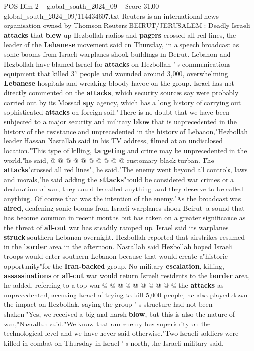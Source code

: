 \begin{textsample}{POS Dim 2 – global\_south\_2024\_09 – Score 31.00 – global\_south\_2024\_09/114434607.txt}  \label{ex:f2_pos_039}
Reuters is an international news organisation owned by Thomson Reuters BEIRUT/JERUSALEM : Deadly Israeli \textbf{attacks} that \textbf{blew} up Hezbollah radios and \textbf{pagers} crossed all red lines, the leader of the \textbf{Lebanese} movement said on Thursday, in a speech broadcast as sonic booms from Israeli warplanes shook buildings in Beirut.
Lebanon and Hezbollah have blamed Israel for \textbf{attacks} on Hezbollah ' s communications equipment that killed 37 people and wounded around 3,000, overwhelming \textbf{Lebanese} hospitals and wreaking bloody havoc on the group.
Israel has not directly commented on the \textbf{attacks}, which security sources say were probably carried out by its Mossad \textbf{spy} agency, which has a long history of carrying out sophisticated \textbf{attacks} on foreign soil."There is no doubt that we have been subjected to a major security and military \textbf{blow} that is unprecedented in the history of the resistance and unprecedented in the history of Lebanon,"Hezbollah leader Hassan Nasrallah said in his TV address, filmed at an undisclosed location."This type of killing, \textbf{targeting} and crime may be unprecedented in the world,"he said, @ @ @ @ @ @ @ @ @ @ customary black turban.
The \textbf{attacks}"crossed all red lines", he said."The enemy went beyond all controls, laws and morals,"he said adding the \textbf{attacks}"could be considered war crimes or a declaration of war, they could be called anything, and they deserve to be called anything.
Of course that was the intention of the enemy."As the broadcast was \textbf{aired}, deafening sonic booms from Israeli warplanes shook Beirut, a sound that has become common in recent months but has taken on a greater significance as the threat of \textbf{all-out} war has steadily ramped up.
Israel said its warplanes \textbf{struck} southern Lebanon overnight.
Hezbollah reported that airstrikes resumed in the \textbf{border} area in the afternoon.
Nasrallah said Hezbollah hoped Israeli troops would enter southern Lebanon because that would create a"historic opportunity"for the \textbf{Iran-backed} group.
No military \textbf{escalation}, killing, \textbf{assassinations} or \textbf{all-out} war would return Israeli residents to the \textbf{border} area, he added, referring to a top war @ @ @ @ @ @ @ @ @ @ the \textbf{attacks} as unprecedented, accusing Israel of trying to kill 5,000 people, he also played down the impact on Hezbollah, saying the group ' s structure had not been shaken."Yes, we received a big and harsh \textbf{blow}, but this is also the nature of war,"Nasrallah said."We know that our enemy has superiority on the technological level and we have never said otherwise."Two Israeli soldiers were killed in combat on Thursday in Israel ' s north, the Israeli military said.

\end{textsample}
